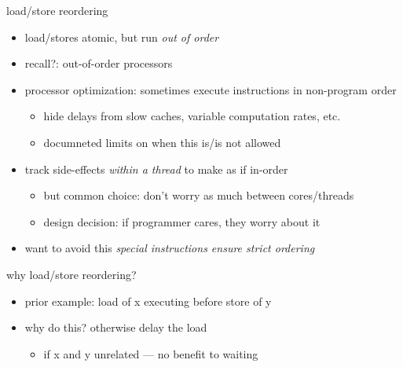 \usetikzlibrary{calc}

\begin{frame}{load/store reordering}
\begin{itemize}
    \item load/stores atomic, but run \textit{out of order}
    \vspace{.5cm}
    \item recall?: out-of-order processors
    \item processor optimization: sometimes execute instructions in non-program order
        \begin{itemize}
        \item hide delays from slow caches, variable computation rates, etc.
        \item documneted limits on when this is/is not allowed
        \end{itemize}
    \item track side-effects \textit{within a thread} to make as if in-order
        \begin{itemize}
        \item but common choice: don't worry as much between cores/threads
        \item design decision: if programmer cares, they worry about it
        \end{itemize}
    \item want to avoid this \textit{special instructions ensure strict ordering}
\end{itemize}
\end{frame}

\begin{frame}{why load/store reordering?}
\begin{itemize}
\item prior example: load of x executing before store of y
\item why do this? otherwise delay the load
    \begin{itemize}
    \item if x and y unrelated --- no benefit to waiting
    \end{itemize}
\end{itemize}
\end{frame}

